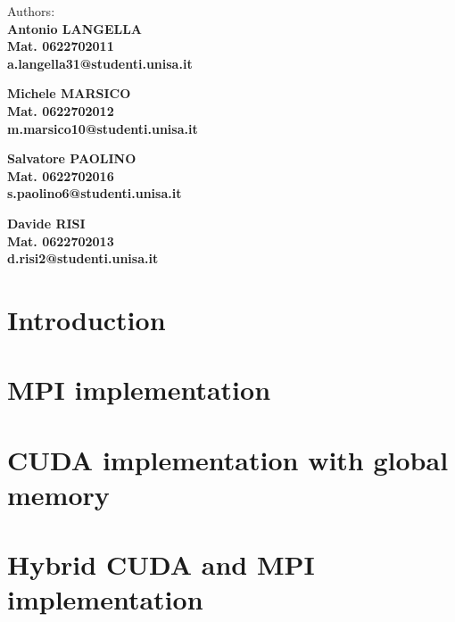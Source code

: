 \documentclass[a4paper, 11pt, oneside]{book}
\begin{document}
\begin{titlepage}
\begin{minipage}[t]{0.47\textwidth}
\begin{figure}[H]
    \end{figure}
   \end{minipage}
    \hfill
    \begin{minipage}[t]{0.4\textwidth}\raggedleft
    	{\large{Authors: \\ \bf Antonio LANGELLA \\ Mat. 0622702011 \\a.langella31@studenti.unisa.it \par\medskip \par\medskip \bf Michele MARSICO \\ Mat. 0622702012 \\m.marsico10@studenti.unisa.it \par\medskip \par\medskip \bf Salvatore PAOLINO \\ Mat. 0622702016 \\s.paolino6@studenti.unisa.it \par\medskip \par\medskip \bf Davide RISI \\ Mat. 0622702013 \\d.risi2@studenti.unisa.it}}
    \end{minipage}
    
    \vspace{15mm}
    

\end{titlepage}

\tableofcontents %
\clearpage
\sloppy
{}

\chapter{Introduction} 


\chapter{MPI implementation}


\chapter{CUDA implementation with global memory}


\chapter{Hybrid CUDA and MPI implementation}

\end{document}
